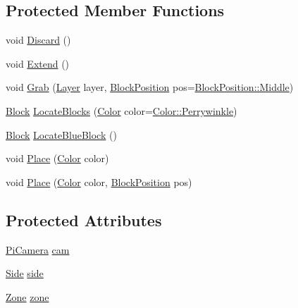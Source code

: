 \subsection*{Protected Member Functions}
\begin{DoxyCompactItemize}
\item 
void \hyperlink{classChipChipArray_1_1Grabber_a09f89b79e745db18009a022e9bfacd3a}{Discard} ()
\item 
void \hyperlink{classChipChipArray_1_1Grabber_abecb4047b4f7d5a7e691b7fb581b5a39}{Extend} ()
\item 
void \hyperlink{classChipChipArray_1_1Grabber_af8e39e110dd0b73398727a0f07c5db40}{Grab} (\hyperlink{definitions_8hpp_abfc825e587f2bcba34a9e7a012e2ce2f}{Layer} layer, \hyperlink{definitions_8hpp_ac8e1b1f4bbac5914204c97f66f97d01f}{Block\+Position} pos=\hyperlink{definitions_8hpp_ac8e1b1f4bbac5914204c97f66f97d01fab1ca34f82e83c52b010f86955f264e05}{Block\+Position\+::\+Middle})
\item 
\hyperlink{classChipChipArray_1_1Block}{Block} \hyperlink{classChipChipArray_1_1Grabber_af49248c957a1695dcde79c0f5f8df99b}{Locate\+Blocks} (\hyperlink{definitions_8hpp_abc05a0f46084a3477cf5d5c939ff1436}{Color} color=\hyperlink{definitions_8hpp_abc05a0f46084a3477cf5d5c939ff1436a1e700ac224a6d34c5b171bb6f462aa41}{Color\+::\+Perrywinkle})
\item 
\hyperlink{classChipChipArray_1_1Block}{Block} \hyperlink{classChipChipArray_1_1Grabber_ab9b0d6a64b2c94c0d0f810a5ebeef6ec}{Locate\+Blue\+Block} ()
\item 
void \hyperlink{classChipChipArray_1_1Grabber_a2833eebf4e57078c0d677379babfd2d4}{Place} (\hyperlink{definitions_8hpp_abc05a0f46084a3477cf5d5c939ff1436}{Color} color)
\item 
void \hyperlink{classChipChipArray_1_1Grabber_a817de2b1ac4208fcbe983e919cede265}{Place} (\hyperlink{definitions_8hpp_abc05a0f46084a3477cf5d5c939ff1436}{Color} color, \hyperlink{definitions_8hpp_ac8e1b1f4bbac5914204c97f66f97d01f}{Block\+Position} pos)
\end{DoxyCompactItemize}
\subsection*{Protected Attributes}
\begin{DoxyCompactItemize}
\item 
\hyperlink{classChipChipArray_1_1PiCamera}{Pi\+Camera} \hyperlink{classChipChipArray_1_1Grabber_a726bcc2367a719cb84de92a981947622}{cam}
\item 
\hyperlink{definitions_8hpp_a03325a8a9d4f105db5e37dd587128142}{Side} \hyperlink{classChipChipArray_1_1Grabber_a8afbaefae7c767c862fd1bf13968539b}{side}
\item 
\hyperlink{definitions_8hpp_adbd1e7a33d3e1751c7b2aa2562d0ecb9}{Zone} \hyperlink{classChipChipArray_1_1Grabber_ab57efe6e0b6f369b19528285a278d967}{zone}
\end{DoxyCompactItemize}



